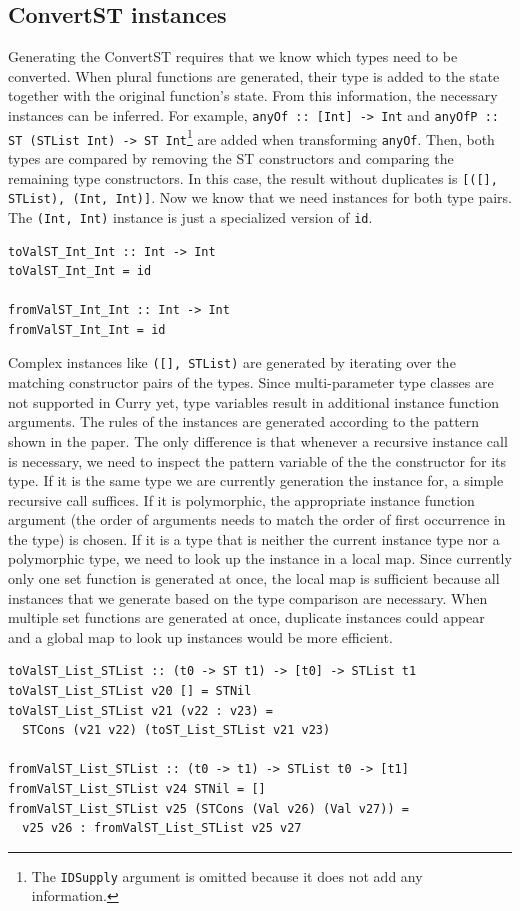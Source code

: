 \documentclass[a4paper, 11pt, fleqn]{scrreprt}
\newcommand{\cinline}[1]{\texttt{#1}}
\begin{document}
\subsection{ConvertST instances}
Generating the ConvertST requires that we know which types need to be converted. When plural functions are generated, their type is added to the state together with the original function's state. From this information, the necessary instances can be inferred.
For example, \cinline{anyOf :: [Int] -> Int} and \cinline{anyOfP :: ST (STList Int) -> ST Int}\footnote{The \cinline{IDSupply} argument is omitted because it does not add any information.} are added when transforming \cinline{anyOf}. Then, both types are compared by removing the ST constructors and comparing the remaining type constructors. In this case, the result without duplicates is \cinline{[([], STList), (Int, Int)]}. Now we know that we need instances for both type pairs. The \cinline{(Int, Int)} instance is just a specialized version of \cinline{id}.
\begin{verbatim}
toValST_Int_Int :: Int -> Int
toValST_Int_Int = id

fromValST_Int_Int :: Int -> Int
fromValST_Int_Int = id
\end{verbatim}
Complex instances like \cinline{([], STList)} are generated by iterating over the matching constructor pairs of the types. Since multi-parameter type classes are not supported in Curry yet, type variables result in additional instance function arguments. The rules of the instances are generated according to the pattern shown in the paper. The only difference is that whenever a recursive instance call is necessary, we need to inspect the pattern variable of the the constructor for its type. If it is the same type we are currently generation the instance for, a simple recursive call suffices. If it is polymorphic, the appropriate instance function argument (the order of arguments needs to match the order of first occurrence in the type) is chosen. If it is a type that is neither the current instance type nor a polymorphic type, we need to look up the instance in a local map. Since currently only one set function is generated at once, the local map is sufficient because all instances that we generate based on the type comparison are necessary. When multiple set functions are generated at once, duplicate instances could appear and a global map to look up instances would be more efficient.

\begin{verbatim}
toValST_List_STList :: (t0 -> ST t1) -> [t0] -> STList t1
toValST_List_STList v20 [] = STNil
toValST_List_STList v21 (v22 : v23) =
  STCons (v21 v22) (toST_List_STList v21 v23)

fromValST_List_STList :: (t0 -> t1) -> STList t0 -> [t1]
fromValST_List_STList v24 STNil = []
fromValST_List_STList v25 (STCons (Val v26) (Val v27)) =
  v25 v26 : fromValST_List_STList v25 v27
\end{verbatim}
\end{document}
